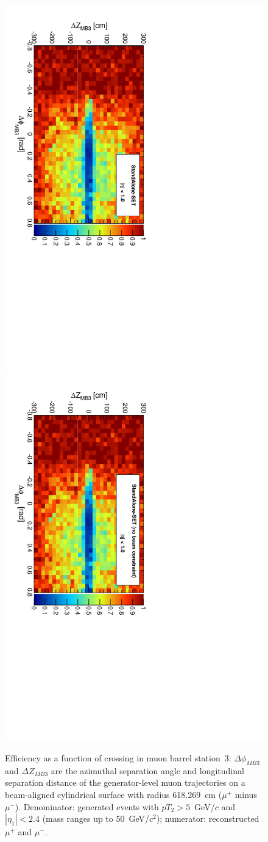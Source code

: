 \documentclass[12pt]{article}
\begin{document}
\begin{figure}[p]
\includegraphics[height=0.5\linewidth, angle=90]{fig/acceptance7_plot/mb3_StandAloneUpdatedSET.pdf}
\includegraphics[height=0.5\linewidth, angle=90]{fig/acceptance7_plot/mb3_StandAloneSET.pdf}

\caption{Efficiency as a function of crossing in muon barrel
  station~3: $\Delta\phi_{MB3}$ and $\Delta Z_{MB3}$ are the azimuthal
  separation angle and longitudinal separation distance of the
  generator-level muon trajectories on a beam-aligned cylindrical
  surface with radius 618.269~cm ($\mu^+$ minus $\mu^-$).
  Denominator: generated events with $pT_2 > 5$~GeV/$c$ and $|\eta_1|
  < 2.4$ (mass ranges up to 50~GeV/$c^2$); numerator: reconstructed
  $\mu^+$ and $\mu^-$. \label{fig:mb3}}
\end{figure}
\end{document}
